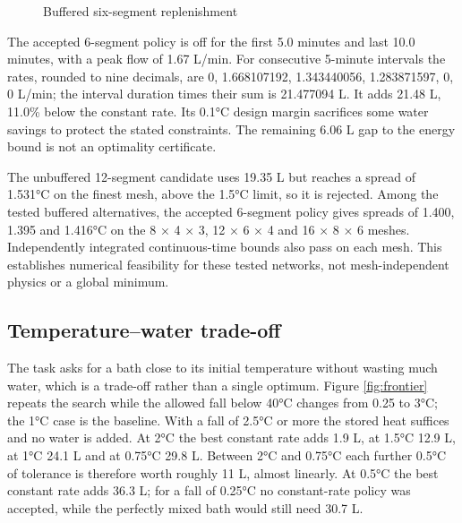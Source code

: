\documentclass[12pt,a4paper]{article}
\begin{document}
\begin{figure}[ht]
\caption{Buffered six-segment replenishment}\label{fig:control}
\end{figure}
The accepted 6-segment policy is off for the first 5.0 minutes and last 10.0 minutes, with a peak flow of 1.67 L/min. For consecutive 5-minute intervals the rates, rounded to nine decimals, are 0, 1.668107192, 1.343440056, 1.283871597, 0, 0 L/min; the interval duration times their sum is 21.477094 L. It adds 21.48 L, 11.0\% below the constant rate. Its 0.1°C design margin sacrifices some water savings to protect the stated constraints. The remaining 6.06 L gap to the energy bound is not an optimality certificate.

The unbuffered 12-segment candidate uses 19.35 L but reaches a spread of 1.531°C on the finest mesh, above the 1.5°C limit, so it is rejected. Among the tested buffered alternatives, the accepted 6-segment policy gives spreads of 1.400, 1.395 and 1.416°C on the 8 × 4 × 3, 12 × 6 × 4 and 16 × 8 × 6 meshes. Independently integrated continuous-time bounds also pass on each mesh. This establishes numerical feasibility for these tested networks, not mesh-independent physics or a global minimum.

\subsection{Temperature–water trade-off}
The task asks for a bath close to its initial temperature without wasting much water, which is a trade-off rather than a single optimum. Figure \ref{fig:frontier} repeats the search while the allowed fall below 40°C changes from 0.25 to 3°C; the 1°C case is the baseline. With a fall of 2.5°C or more the stored heat suffices and no water is added. At 2°C the best constant rate adds 1.9 L, at 1.5°C 12.9 L, at 1°C 24.1 L and at 0.75°C 29.8 L. Between 2°C and 0.75°C each further 0.5°C of tolerance is therefore worth roughly 11 L, almost linearly. At 0.5°C the best constant rate adds 36.3 L; for a fall of 0.25°C no constant-rate policy was accepted, while the perfectly mixed bath would still need 30.7 L.
\end{document}
